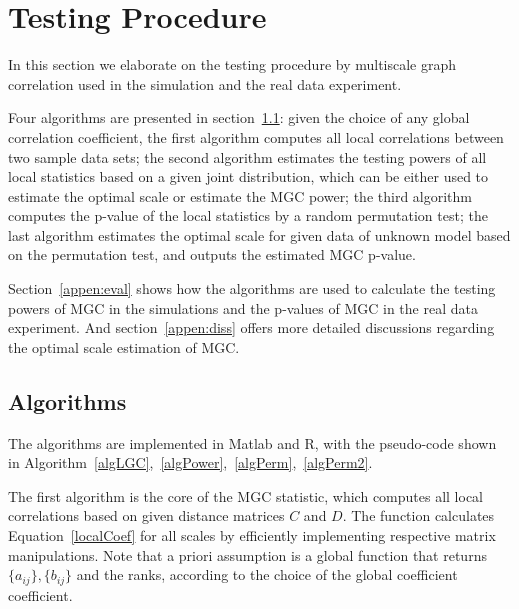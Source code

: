 \documentclass[11pt]{article}
\begin{document}

\section{Testing Procedure}
\label{appen:tests}

In this section we elaborate on the testing procedure by multiscale graph correlation used in the simulation and the real data experiment. 

Four algorithms are presented in section~\ref{appen:algorithms}: given the choice of any global correlation coefficient, the first algorithm computes all local correlations between two sample data sets; the second algorithm estimates the testing powers of all local statistics based on a given joint distribution, which can be either used to estimate the optimal scale or estimate the MGC power; the third algorithm computes the p-value of the local statistics by a random permutation test; the last algorithm estimates the optimal scale for given data of unknown model based on the permutation test, and outputs the estimated MGC p-value. 

Section~\ref{appen:eval} shows how the algorithms are used to calculate the testing powers of MGC in the simulations and the p-values of MGC in the real data experiment. And section~\ref{appen:diss} offers more detailed discussions regarding the optimal scale estimation of MGC.

\subsection{Algorithms}
\label{appen:algorithms}
The algorithms are implemented in Matlab and R, with the pseudo-code shown in Algorithm~\ref{algLGC},~\ref{algPower},~\ref{algPerm},~\ref{algPerm2}.

The first algorithm is the core of the MGC statistic, which computes all local correlations based on given distance matrices $C$ and $D$. The function calculates Equation~\ref{localCoef} for all scales by efficiently implementing respective matrix manipulations. Note that a priori assumption is a global function that returns $\{a_{ij}\},\{b_{ij}\}$ and the ranks, according to the choice of the global coefficient coefficient.
\end{document}
